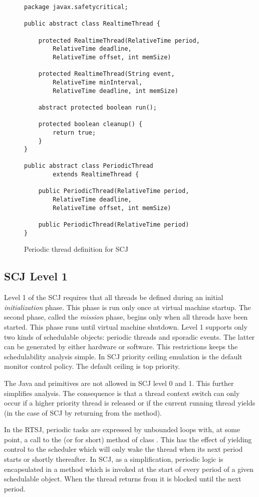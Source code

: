 \begin{figure}[t!]
{\small
\begin{verbatim}
package javax.safetycritical;

public abstract class RealtimeThread {

    protected RealtimeThread(RelativeTime period,
        RelativeTime deadline,
        RelativeTime offset, int memSize)

    protected RealtimeThread(String event,
        RelativeTime minInterval,
        RelativeTime deadline, int memSize)

    abstract protected boolean run();

    protected boolean cleanup() {
        return true;
    }
}

public abstract class PeriodicThread
        extends RealtimeThread {

    public PeriodicThread(RelativeTime period,
        RelativeTime deadline,
        RelativeTime offset, int memSize)

    public PeriodicThread(RelativeTime period)
}
\end{verbatim} }
\caption{Periodic thread definition for SCJ}\label{lst:scjdef}
\end{figure}

\subsection{SCJ Level 1}

Level 1 of the SCJ requires that all threads be defined during an
initial \emph{initialization} phase. This phase is run only once at
virtual machine startup. The second phase, called the \emph{mission}
phase, begins only when all threads have been started. This phase
runs until virtual machine shutdown. Level 1 supports only two kinds
of schedulable objects: periodic threads and sporadic events. The
latter can be generated by either hardware or software. This
restrictions keeps the schedulability analysis simple. In SCJ
priority ceiling emulation is the default monitor control policy.
The default ceiling is top priority.

The Java  and  primitives are not allowed in
SCJ level 0 and 1. This further simplifies analysis. The consequence
is that a thread context switch can only occur if a higher priority
thread is released or if the current running thread yields (in the
case of SCJ by returning from the  method).

In the RTSJ, periodic tasks are expressed by unbounded loops with,
at some point, a call to the  (or
 for short) method of class . This
has the effect of yielding control to the scheduler which will only
wake the thread when its next period starts or shortly thereafter.
In SCJ, as a simplification, periodic logic is encapsulated in a
 method which is invoked at the start of every period of
a given schedulable object. When the thread returns from
 it is blocked until the next period.

